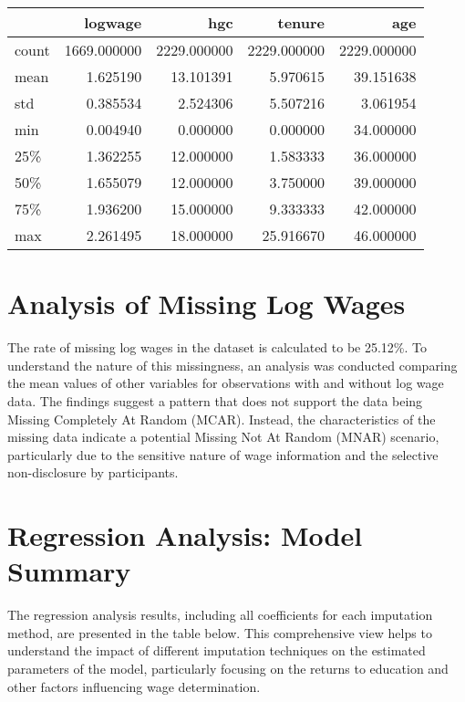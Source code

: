 \documentclass[12pt]{article}
\begin{document}
\begin{tabular}{lrrrr}
\toprule
{} &      logwage &          hgc &       tenure &          age \\
\midrule
count &  1669.000000 &  2229.000000 &  2229.000000 &  2229.000000 \\
mean  &     1.625190 &    13.101391 &     5.970615 &    39.151638 \\
std   &     0.385534 &     2.524306 &     5.507216 &     3.061954 \\
min   &     0.004940 &     0.000000 &     0.000000 &    34.000000 \\
25\%   &     1.362255 &    12.000000 &     1.583333 &    36.000000 \\
50\%   &     1.655079 &    12.000000 &     3.750000 &    39.000000 \\
75\%   &     1.936200 &    15.000000 &     9.333333 &    42.000000 \\
max   &     2.261495 &    18.000000 &    25.916670 &    46.000000 \\
\bottomrule
\end{tabular}

\section{Analysis of Missing Log Wages}
The rate of missing log wages in the dataset is calculated to be 25.12\%. To understand the nature of this missingness, an analysis was conducted comparing the mean values of other variables for observations with and without log wage data. The findings suggest a pattern that does not support the data being Missing Completely At Random (MCAR). Instead, the characteristics of the missing data indicate a potential Missing Not At Random (MNAR) scenario, particularly due to the sensitive nature of wage information and the selective non-disclosure by participants.

\section{Regression Analysis: Model Summary}
The regression analysis results, including all coefficients for each imputation method, are presented in the table below. This comprehensive view helps to understand the impact of different imputation techniques on the estimated parameters of the model, particularly focusing on the returns to education and other factors influencing wage determination.
\end{document}
